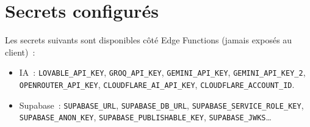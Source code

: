 \section{Secrets configurés}
Les secrets suivants sont disponibles côté Edge Functions (jamais exposés au
client)~:
\begin{itemize}
  \item IA~: \texttt{LOVABLE\_API\_KEY}, \texttt{GROQ\_API\_KEY},
        \texttt{GEMINI\_API\_KEY}, \texttt{GEMINI\_API\_KEY\_2},
        \texttt{OPENROUTER\_API\_KEY}, \texttt{CLOUDFLARE\_AI\_API\_KEY},
        \texttt{CLOUDFLARE\_ACCOUNT\_ID}.
  \item Supabase~: \texttt{SUPABASE\_URL}, \texttt{SUPABASE\_DB\_URL},
        \texttt{SUPABASE\_SERVICE\_ROLE\_KEY}, \texttt{SUPABASE\_ANON\_KEY},
        \texttt{SUPABASE\_PUBLISHABLE\_KEY}, \texttt{SUPABASE\_JWKS}\dots
\end{itemize}

